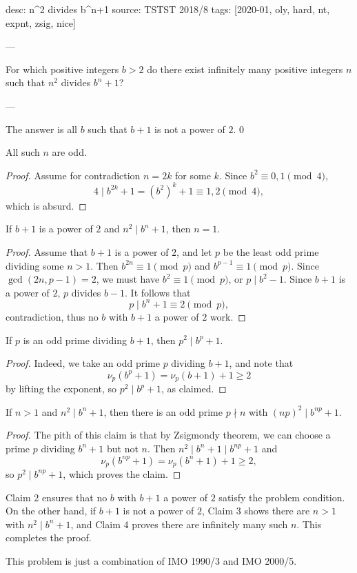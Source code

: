 desc: n^2 divides b^n+1
source: TSTST 2018/8
tags: [2020-01, oly, hard, nt, expnt, zsig, nice]

---

For which positive integers $b>2$ do there exist infinitely many positive integers $n$ such that $n^2$ divides $b^n+1$?

---

The answer is all $b$ such that $b+1$ is not a power of $2$.
\setcounter{claim}0
\begin{claim}
    All such $n$ are odd.
\end{claim}
\begin{proof}
    Assume for contradiction $n=2k$ for some $k$. Since $b^2\equiv0,1\pmod4$, \[4\mid b^{2k}+1=\left(b^2\right)^k+1\equiv1,2\pmod4,\]
    which is absurd.
\end{proof}
\begin{claim}
    If $b+1$ is a power of $2$ and $n^2\mid b^n+1$, then $n=1$.
\end{claim}
\begin{proof}
    Assume that $b+1$ is a power of $2$, and let $p$ be the least odd prime dividing some $n>1$. Then $b^{2n}\equiv1\pmod p$ and $b^{p-1}\equiv1\pmod p$. Since $\gcd(2n,p-1)=2$, we must have $b^2\equiv1\pmod p$, or $p\mid b^2-1$. Since $b+1$ is a power of $2$, $p$ divides $b-1$. It follows that \[p\mid b^n+1\equiv2\pmod p,\]
    contradiction, thus no $b$ with $b+1$ a power of $2$ work.
\end{proof}
\begin{claim}
    If $p$ is an odd prime dividing $b+1$, then $p^2\mid b^p+1$.
\end{claim}
\begin{proof}
    Indeed, we take an odd prime $p$ dividing $b+1$, and note that \[\nu_p\left(b^p+1\right)=\nu_p(b+1)+1\ge2\]
    by lifting the exponent, so $p^2\mid b^p+1$, as claimed.
\end{proof}
\begin{claim}
    If $n>1$ and $n^2\mid b^n+1$, then there is an odd prime $p\nmid n$ with $(np)^2\mid b^{np}+1$.
\end{claim}
\begin{proof}
    The pith of this claim is that by Zsigmondy theorem, we can choose a prime $p$ dividing $b^n+1$ but not $n$. Then $n^2\mid b^n+1\mid b^{np}+1$ and \[\nu_p\left(b^{np}+1\right)=\nu_p\left(b^n+1\right)+1\ge2,\]
    so $p^2\mid b^{np}+1$, which proves the claim.
\end{proof}

Claim 2 ensures that no $b$ with $b+1$ a power of $2$ satisfy the problem condition. On the other hand, if $b+1$ is not a power of $2$, Claim 3 shows there are $n>1$ with $n^2\mid b^n+1$, and Claim 4 proves  there are infinitely many such $n$. This completes the proof.
\begin{remark}
    This problem is just a combination of IMO 1990/3 and IMO 2000/5.
\end{remark}
